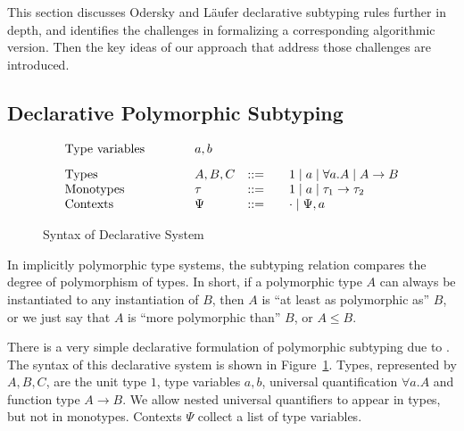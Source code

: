 
This section discusses Odersky and L\"aufer declarative subtyping rules further in depth,
and identifies the challenges in formalizing a corresponding
algorithmic version. Then the key ideas of our approach that address
those challenges are introduced.


\begin{comment}
The subtyping relation is typically
used by the subsumption rule for type inference, e.g.
$$\inferrule*[right=Sub]
  {\Gamma\vdash t : A \quad A\le B}
  {\Gamma\vdash t : B}
$$
where $t$ represents a term, and the relation $\Gamma\vdash t : A$
reads ``term $t$ has type $A$ under context $\Gamma$''.
\end{comment}

\subsection{Declarative Polymorphic Subtyping}\label{declarative_subtyping}

\begin{figure}[t]
\[
\begin{array}{l@{\qquad}lcl}
\text{Type variables}\qquad&a, b\\[3mm]
\text{Types}\qquad&A, B, C &::=&\quad 1 \mid a \mid \forall a. A \mid A\to B\\
\text{Monotypes}\qquad&\tau &::=&\quad 1 \mid a \mid \tau_1\to \tau_2\\
\text{Contexts}\qquad&\Psi &::=&\quad \cdot \mid \Psi, a\\
\end{array}
\]
\caption{Syntax of Declarative System}\label{fig:decl:syntax}
\end{figure}


In implicitly polymorphic type systems, the subtyping relation
compares the degree of polymorphism of types. In short, if a
polymorphic type $A$ can always be instantiated to any instantiation
of $B$, then $A$ is ``at least as polymorphic as'' $B$, or we just say
that $A$ is ``more polymorphic than'' $B$, or $A\le B$.  

There is a very simple declarative formulation of
polymorphic subtyping due to \citet{odersky1996putting}. The syntax
of this declarative system is shown in Figure~\ref{fig:decl:syntax}. Types,
represented by $A, B, C$, are the unit type $1$, type variables
$a, b$, universal quantification $\forall a. A$ and function type
$A\to B$. We allow nested universal quantifiers to appear in
types, but not in monotypes. Contexts $\Psi$ collect a list
of type variables.


